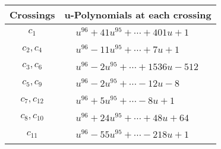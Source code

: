 \documentclass[1p]{elsarticle_modified}
\theoremstyle{definition}
\begin{document}
\begin{tabular}{m{50pt}|m{274pt}}
Crossings & \hspace{64pt}u-Polynomials at each crossing \\
\hline $$\begin{aligned}c_{1}\end{aligned}$$&$\begin{aligned}
&u^{96}+41 u^{95}+\cdots+401 u+1
\end{aligned}$\\
\hline $$\begin{aligned}c_{2},c_{4}\end{aligned}$$&$\begin{aligned}
&u^{96}-11 u^{95}+\cdots+7 u+1
\end{aligned}$\\
\hline $$\begin{aligned}c_{3},c_{6}\end{aligned}$$&$\begin{aligned}
&u^{96}-2 u^{95}+\cdots+1536 u-512
\end{aligned}$\\
\hline $$\begin{aligned}c_{5},c_{9}\end{aligned}$$&$\begin{aligned}
&u^{96}-2 u^{95}+\cdots-12 u-8
\end{aligned}$\\
\hline $$\begin{aligned}c_{7},c_{12}\end{aligned}$$&$\begin{aligned}
&u^{96}+5 u^{95}+\cdots-8 u+1
\end{aligned}$\\
\hline $$\begin{aligned}c_{8},c_{10}\end{aligned}$$&$\begin{aligned}
&u^{96}+24 u^{95}+\cdots+48 u+64
\end{aligned}$\\
\hline $$\begin{aligned}c_{11}\end{aligned}$$&$\begin{aligned}
&u^{96}-55 u^{95}+\cdots-218 u+1
\end{aligned}$\\
\hline
\end{tabular}\\~\\
\newpage\renewcommand{\arraystretch}{1}
\end{document}
